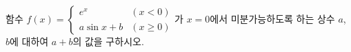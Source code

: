 함수 $f(x)=\begin{cases} e^x & (x<0) \\ a\sin x+b & (x\ge 0) \end{cases}$가 $x=0$에서 미분가능하도록 하는 상수 $a$, $b$에 대하여 $a+b$의 값을 구하시오.
